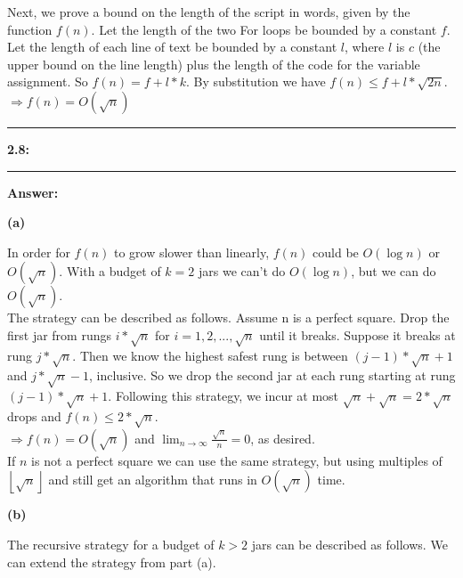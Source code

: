 \documentclass[11pt]{article}
\newcommand\question[2]{\vspace{.25in}\hrule\textbf{#1: #2}\vspace{.5em}\hrule\vspace{.10in}}
\renewcommand\part[1]{\vspace{.10in}\textbf{(#1)}}
\newcommand\answer{\vspace{.10in}\textbf{Answer: }}
\begin{document}
Next, we prove a bound on the length of the script in words, given by the function $f(n)$. Let the length of the two For loops be bounded by a constant $f$. Let the length of each line of text be bounded by a constant $l$, where $l$ is $c$ (the upper bound on the line length) plus the length of the code for the variable assignment. So $f(n) = f + l*k$. By substitution we have $f(n) \leq f + l * \sqrt{2n}$.\\

$\Rightarrow f(n) = O(\sqrt{n})$\\

\clearpage

\question{2.8}{}

\answer

\part{a}

In order for $f(n)$ to grow slower than linearly, $f(n)$ could be $O(\log{}n)$ or $O(\sqrt{n})$. With a budget of $k = 2$ jars we can't do $O(\log{}n)$, but we can do $O(\sqrt{n})$.\\

The strategy can be described as follows. Assume n is a perfect square. Drop the first jar from rungs $i * \sqrt{n}$ for $i = 1, 2, ..., \sqrt{n}$ until it breaks. Suppose it breaks at rung $j * \sqrt{n}$. Then we know the highest safest rung is between $(j - 1) * \sqrt{n} + 1$ and $j * \sqrt{n} - 1$, inclusive. So we drop the second jar at each rung starting at rung $(j - 1) * \sqrt{n} + 1$. Following this strategy, we incur at most $\sqrt{n} + \sqrt{n} = 2 * \sqrt{n}$ drops and $f(n) \leq 2 * \sqrt{n}$.\\

$\Rightarrow f(n) = O(\sqrt{n})$ and $\lim_{n\to\infty} \frac{\sqrt{n}}{n} = 0$, as desired.\\

If $n$ is not a perfect square we can use the same strategy, but using multiples of $\left \lfloor{\sqrt{n}}\right \rfloor$ and still get an algorithm that runs in $O(\sqrt{n})$ time.

\part{b}

The recursive strategy for a budget of $k > 2$ jars can be described as follows. We can extend the strategy from part (a).\\
\end{document}
